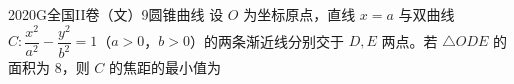 
\begin{problem}{2020}{G}{全国II卷（文）}{9}{圆锥曲线}
设 $ O $ 为坐标原点，直线 $ x=a $ 与双曲线 $ C:\dfrac{x^2}{a^2}-\dfrac{y^2}{b^2}=1 $（$ a>0 $，$ b>0 $）的两条渐近线分别交于 $ D,E $ 两点。若 $ \triangle ODE $ 的面积为 $ 8 $，则 $ C $ 的焦距的最小值为
\begin{choices}
\end{choices}
\end{problem}

\begin{answer}

\end{answer}

\begin{solutions}

\end{solutions}